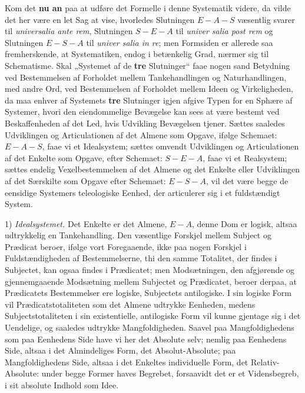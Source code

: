 \documentclass[11pt]{book}
\newcommand{\opage}[1]{\marginnote{\footnotesize\textit{[#1]}}}
\begin{document}
Kom det \textbf{nu an} paa at udføre det Formelle i denne Systematik
videre, da vilde det her være en let Sag at vise, hvorledes Slutningen
$E - A - S$ væsentlig svarer til \textit{universalia ante rem},
Slutningen $S - E - A$ til \textit{univer\-%
salia post rem} og Slutningen $E - S - A$ til \textit{univer\-%
salia in re}; men Formsiden er allerede saa fremherskende, at
\opage{216} \setcounter{footnote}{0}%
Systematiken, endog i betænkelig Grad, nærmer sig til Schematisme. Skal
„Systemet af de \textbf{tre} Slutninger“ faae nogen sand Betydning ved
Bestemmelsen af Forholdet mellem Tankehandlingen og Naturhandlingen,
med andre Ord, ved Bestemmelsen af Forholdet mellem Ideen og
Virkeligheden, da maa enhver af Systemets \textbf{tre} Slutninger igjen
afgive Typen for en Sphære af Systemer, hvori den eiendommelige
Bevægelse kan sees at være bestemt ved Beskaffenheden af det Led, hvis
Udvikling Bevægelsen tjener. Sættes saaledes Udviklingen og
Articulationen af det Almene som Opgave, ifølge Schemaet: $E - A - S$,
faae vi et Idealsystem; sættes omvendt Udviklingen og Articulationen af
det Enkelte som Opgave, efter Schemaet: $S - E - A$, faae vi et
Realsystem; sættes endelig Vexelbestemmelsen af det Almene og det
Enkelte eller Udviklingen af det Særskilte som Opgave efter Schemaet:
$E - S - A$, vil det være begge de eensidige Systemers teleologiske
Eenhed, der articulerer sig i et fuldstændigt System.

1) \emph{Idealsystemet.} Det Enkelte er det Almene, $E - A$, denne Dom
er logisk, altsaa udtrykkelig en Tankehandling. Den væsentlige Forskjel
mellem Subject og Prædicat beroer, ifølge vort Foregaaende, ikke paa
nogen Forskjel i Fuldstændigheden af Bestemmelserne, thi den samme
Totalitet, der findes i Subjectet, kan ogsaa findes i Prædicatet; men
Modsætningen, den afgjørende og gjennemgaaende Modsætning mellem
Subjectet og Prædicatet, beroer derpaa, at Prædicatets Bestemmelser ere
logiske, Subjectets antilogiske. I sin logiske Form vil
Prædicatstotaliteten som det Almene udtrykke Eenheden, medens
Subjectstotaliteten i sin existentielle, antilogiske Form vil kunne
gjentage sig i det Uendelige, og saaledes udtrykke Mangfoldigheden.
Saavel paa Mangfoldighedens som paa Eenhedens Side have vi her det
Absolute selv; nemlig paa Eenhedens Side, altsaa i det Almindeliges
Form, det Absolut-Absolute; paa Mangfoldighedens Side,
\opage{217} \setcounter{footnote}{0}%
altsaa i det Enkeltes individuelle Form, det Relativ-Absolute: under
begge Former haves Begrebet, forsaavidt det er et Vidensbegreb, i sit
absolute Indhold som Idee.
\end{document}
